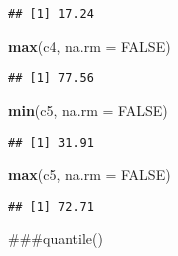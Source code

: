 \documentclass[
]{article}
\newenvironment{Shaded}{\begin{snugshade}}{\end{snugshade}}
\newcommand{\AttributeTok}[1]{\textcolor[rgb]{0.13,0.29,0.53}{#1}}
\newcommand{\ConstantTok}[1]{\textcolor[rgb]{0.56,0.35,0.01}{#1}}
\newcommand{\FunctionTok}[1]{\textcolor[rgb]{0.13,0.29,0.53}{\textbf{#1}}}
\newcommand{\NormalTok}[1]{#1}
\begin{document}
\begin{verbatim}
## [1] 17.24
\end{verbatim}

\begin{Shaded}
\begin{Highlighting}[]
\FunctionTok{max}\NormalTok{(c4, }\AttributeTok{na.rm =} \ConstantTok{FALSE}\NormalTok{)}
\end{Highlighting}
\end{Shaded}

\begin{verbatim}
## [1] 77.56
\end{verbatim}

\begin{Shaded}
\begin{Highlighting}[]
\FunctionTok{min}\NormalTok{(c5, }\AttributeTok{na.rm =} \ConstantTok{FALSE}\NormalTok{)}
\end{Highlighting}
\end{Shaded}

\begin{verbatim}
## [1] 31.91
\end{verbatim}

\begin{Shaded}
\begin{Highlighting}[]
\FunctionTok{max}\NormalTok{(c5, }\AttributeTok{na.rm =} \ConstantTok{FALSE}\NormalTok{)}
\end{Highlighting}
\end{Shaded}

\begin{verbatim}
## [1] 72.71
\end{verbatim}

\#\#\#quantile()
\end{document}
